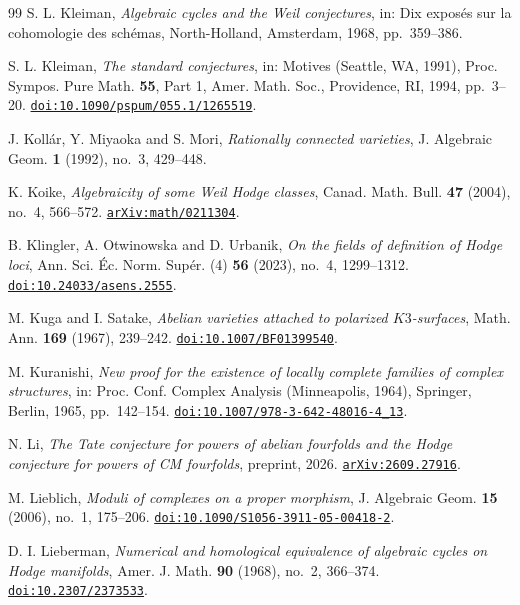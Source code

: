 \begin{thebibliography}{99}
S. L. Kleiman,
\emph{Algebraic cycles and the Weil conjectures},
in: Dix expos\'es sur la cohomologie des sch\'emas,
North-Holland, Amsterdam, 1968, pp.~359--386.

S. L. Kleiman,
\emph{The standard conjectures},
in: Motives (Seattle, WA, 1991),
Proc. Sympos. Pure Math. \textbf{55}, Part 1,
Amer. Math. Soc., Providence, RI, 1994, pp.~3--20.
\href{https://doi.org/10.1090/pspum/055.1/1265519}{\texttt{doi:10.1090/pspum/055.1/1265519}}.

J. Koll\'ar, Y. Miyaoka and S. Mori,
\emph{Rationally connected varieties},
J. Algebraic Geom. \textbf{1} (1992), no.~3, 429--448.

K. Koike,
\emph{Algebraicity of some Weil Hodge classes},
Canad. Math. Bull. \textbf{47} (2004), no.~4, 566--572.
\href{https://arxiv.org/abs/math/0211304}{\texttt{arXiv:math/0211304}}.

B. Klingler, A. Otwinowska and D. Urbanik,
\emph{On the fields of definition of Hodge loci},
Ann. Sci. \'Ec. Norm. Sup\'er. (4) \textbf{56} (2023), no.~4, 1299--1312.
\href{https://doi.org/10.24033/asens.2555}{\texttt{doi:10.24033/asens.2555}}.

M. Kuga and I. Satake,
\emph{Abelian varieties attached to polarized $K3$-surfaces},
Math. Ann. \textbf{169} (1967), 239--242.
\href{https://doi.org/10.1007/BF01399540}{\texttt{doi:10.1007/BF01399540}}.

M. Kuranishi,
\emph{New proof for the existence of locally complete families of complex
structures},
in: Proc. Conf. Complex Analysis (Minneapolis, 1964),
Springer, Berlin, 1965, pp.~142--154.
\href{https://doi.org/10.1007/978-3-642-48016-4_13}{\texttt{doi:10.1007/978-3-642-48016-4\_13}}.

N. Li,
\emph{The Tate conjecture for powers of abelian fourfolds and the Hodge
conjecture for powers of CM fourfolds},
preprint, 2026.
\href{https://arxiv.org/abs/2609.27916}{\texttt{arXiv:2609.27916}}.

M. Lieblich,
\emph{Moduli of complexes on a proper morphism},
J. Algebraic Geom. \textbf{15} (2006), no.~1, 175--206.
\href{https://doi.org/10.1090/S1056-3911-05-00418-2}%
{\texttt{doi:10.1090/S1056-3911-05-00418-2}}.

D. I. Lieberman,
\emph{Numerical and homological equivalence of algebraic cycles on Hodge
manifolds},
Amer. J. Math. \textbf{90} (1968), no.~2, 366--374.
\href{https://doi.org/10.2307/2373533}{\texttt{doi:10.2307/2373533}}.


\end{thebibliography}
